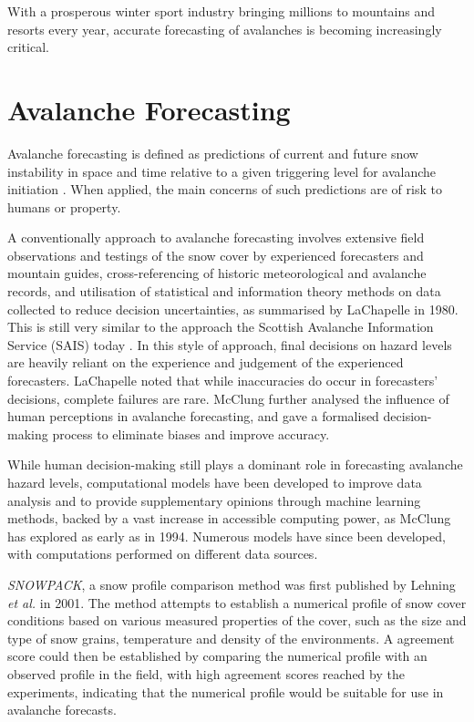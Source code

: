 \documentclass[openany]{UoYCSproject}
\begin{document}
With a prosperous winter sport industry bringing millions to mountains and resorts every year\cite{hudson2003sport}, accurate forecasting of avalanches is becoming increasingly critical. 

\section{Avalanche Forecasting}

Avalanche forecasting is defined as predictions of current and future snow instability in space and time relative to a given triggering level for avalanche initiation \cite[p. 131]{McClung2002}. When applied, the main concerns of such predictions are of risk to humans or property. 

A conventionally approach to avalanche forecasting involves extensive field observations and testings of the snow cover by experienced forecasters and mountain guides, cross-referencing of historic meteorological and avalanche records, and utilisation of statistical and information theory methods on data collected to reduce decision uncertainties, as summarised by LaChapelle \cite{lachapelle1980fundamental} in 1980. This is still very similar to the approach the Scottish Avalanche Information Service (SAIS) today \cite[p. 5]{sais2014-15}. In this style of approach, final decisions on hazard levels are heavily reliant on the experience and judgement of the experienced forecasters. LaChapelle noted \cite[p. 76]{lachapelle1980fundamental} that while inaccuracies do occur in forecasters' decisions, complete failures are rare. McClung \cite{mcclung2006avalanche} further analysed the influence of human perceptions in avalanche forecasting, and gave a formalised decision-making process to eliminate biases and improve accuracy.

While human decision-making still plays a dominant role in forecasting avalanche hazard levels, computational models have been developed to improve data analysis and to provide supplementary opinions through machine learning methods, backed by a vast increase in accessible computing power, as McClung \cite{McClung1994} has explored as early as in 1994. Numerous models have since been developed, with computations performed on different data sources. 

\textit{SNOWPACK}, a snow profile comparison method was first published by Lehning \textit{et al.} \cite{Lehning2001253} in 2001. The method attempts to establish a numerical profile of snow cover conditions based on various measured properties of the cover, such as the size and type of snow grains, temperature and density of the environments. A agreement score could then be established by comparing the numerical profile with an observed profile in the field, with high agreement scores reached by the experiments, indicating that the numerical profile would be suitable for use in avalanche forecasts. 
\end{document}
